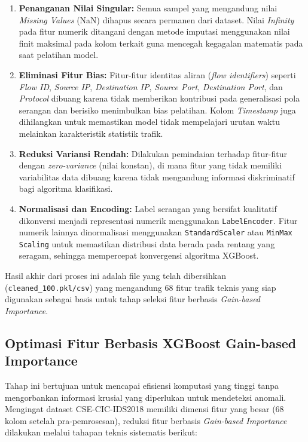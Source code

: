 \documentclass[11pt, a4paper]{article}
\begin{document}
\begin{enumerate}
    \item \textbf{Penanganan Nilai Singular:} Semua sampel yang mengandung nilai \textit{Missing Values} (NaN) dihapus secara permanen dari dataset. Nilai \textit{Infinity} pada fitur numerik ditangani dengan metode imputasi menggunakan nilai finit maksimal pada kolom terkait guna mencegah kegagalan matematis pada saat pelatihan model.
    \item \textbf{Eliminasi Fitur Bias:} Fitur-fitur identitas aliran (\textit{flow identifiers}) seperti \textit{Flow ID}, \textit{Source IP}, \textit{Destination IP}, \textit{Source Port}, \textit{Destination Port}, dan \textit{Protocol} dibuang karena tidak memberikan kontribusi pada generalisasi pola serangan dan berisiko menimbulkan bias pelatihan. Kolom \textit{Timestamp} juga dihilangkan untuk memastikan model tidak mempelajari urutan waktu melainkan karakteristik statistik trafik.
    \item \textbf{Reduksi Variansi Rendah:} Dilakukan pemindaian terhadap fitur-fitur dengan \textit{zero-variance} (nilai konstan), di mana fitur yang tidak memiliki variabilitas data dibuang karena tidak mengandung informasi diskriminatif bagi algoritma klasifikasi.
    \item \textbf{Normalisasi dan Encoding:} Label serangan yang bersifat kualitatif dikonversi menjadi representasi numerik menggunakan \texttt{LabelEncoder}. Fitur numerik lainnya dinormalisasi menggunakan \texttt{StandardScaler} atau \texttt{MinMax Scaling} untuk memastikan distribusi data berada pada rentang yang seragam, sehingga mempercepat konvergensi algoritma XGBoost.
\end{enumerate}

Hasil akhir dari proses ini adalah file yang telah dibersihkan (\texttt{cleaned\_100.pkl/csv}) yang mengandung 68 fitur trafik teknis yang siap digunakan sebagai basis untuk tahap seleksi fitur berbasis \textit{Gain-based Importance}.


\subsection{Optimasi Fitur Berbasis XGBoost Gain-based Importance}
Tahap ini bertujuan untuk mencapai efisiensi komputasi yang tinggi tanpa mengorbankan informasi krusial yang diperlukan untuk mendeteksi anomali. Mengingat dataset CSE-CIC-IDS2018 memiliki dimensi fitur yang besar (68 kolom setelah pra-pemrosesan), reduksi fitur berbasis \textit{Gain-based Importance} dilakukan melalui tahapan teknis sistematis berikut:
\end{document}
